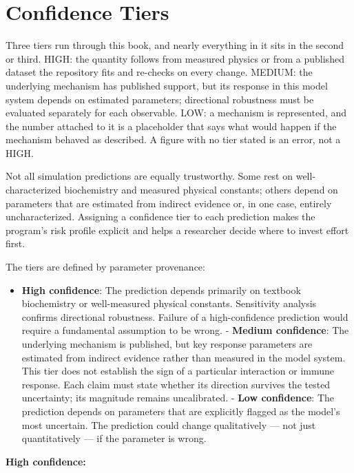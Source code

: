 \documentclass[11pt,twoside,openright]{report}
\begin{document}
\section{Confidence Tiers}

\begin{numbers}
Three tiers run through this book, and nearly everything in it sits in the second or third. HIGH: the quantity follows from measured physics or from a published dataset the repository fits and re-checks on every change. MEDIUM: the underlying mechanism has published support, but its response in this model system depends on estimated parameters; directional robustness must be evaluated separately for each observable. LOW: a mechanism is represented, and the number attached to it is a placeholder that says what would happen if the mechanism behaved as described. A figure with no tier stated is an error, not a HIGH.
\end{numbers}

Not all simulation predictions are equally trustworthy. Some rest on well-characterized biochemistry and measured physical constants; others depend on parameters that are estimated from indirect evidence or, in one case, entirely uncharacterized. Assigning a confidence tier to each prediction makes the program's risk profile explicit and helps a researcher decide where to invest effort first.

The tiers are defined by parameter provenance:

\begin{itemize}
\item \textbf{High confidence}: The prediction depends primarily on textbook biochemistry or well-measured physical constants. Sensitivity analysis confirms directional robustness. Failure of a high-confidence prediction would require a fundamental assumption to be wrong.
- \textbf{Medium confidence}: The underlying mechanism is published, but key response parameters are estimated from indirect evidence rather than measured in the model system. This tier does not establish the sign of a particular interaction or immune response. Each claim must state whether its direction survives the tested uncertainty; its magnitude remains uncalibrated.
- \textbf{Low confidence}: The prediction depends on parameters that are explicitly flagged as the model's most uncertain. The prediction could change qualitatively --- not just quantitatively --- if the parameter is wrong.
\end{itemize}

\textbf{High confidence:}
\end{document}

